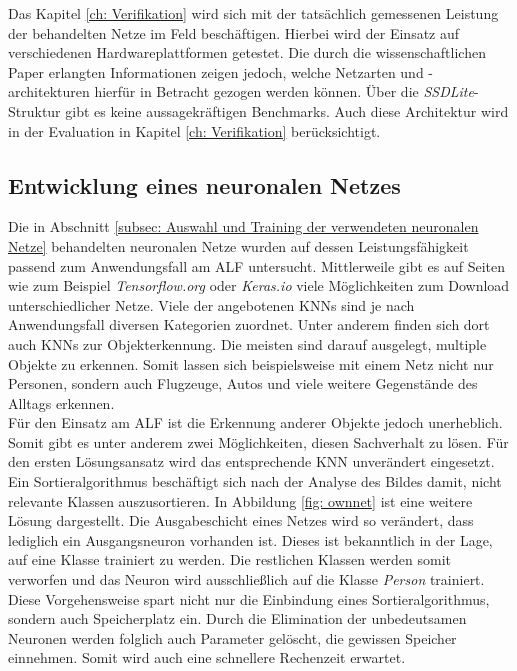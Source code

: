 		Das Kapitel \ref{ch: Verifikation} wird sich mit der tatsächlich gemessenen Leistung der behandelten Netze im Feld beschäftigen. Hierbei wird der Einsatz auf verschiedenen Hardwareplattformen getestet. Die durch die wissenschaftlichen Paper erlangten Informationen zeigen jedoch, welche Netzarten und -architekturen hierfür in Betracht gezogen werden können. Über die \textit{SSDLite}-Struktur gibt es keine aussagekräftigen Benchmarks. Auch diese Architektur wird in der Evaluation in Kapitel \ref{ch: Verifikation} berücksichtigt.
		
		\subsection{Entwicklung eines neuronalen Netzes}
		\label{subsec: Entwickeltes neuronales Netz}
		
		Die in Abschnitt \ref{subsec: Auswahl und Training der verwendeten neuronalen Netze} behandelten neuronalen Netze wurden auf dessen Leistungsfähigkeit passend zum Anwendungsfall am ALF untersucht. Mittlerweile gibt es auf Seiten wie zum Beispiel \textit{Tensorflow.org} oder \textit{Keras.io} viele Möglichkeiten zum Download unterschiedlicher Netze. Viele der angebotenen KNNs sind je nach Anwendungsfall diversen Kategorien zuordnet. Unter anderem finden sich dort auch KNNs zur Objekterkennung. Die meisten sind darauf ausgelegt, multiple Objekte zu erkennen. Somit lassen sich beispielsweise mit einem Netz nicht nur Personen, sondern auch Flugzeuge, Autos und viele weitere Gegenstände des Alltags erkennen. \\ 
		
		
		
		Für den Einsatz am ALF ist die Erkennung anderer Objekte jedoch unerheblich. Somit gibt es unter anderem zwei Möglichkeiten, diesen Sachverhalt zu lösen. Für den ersten Lösungsansatz wird das entsprechende KNN unverändert eingesetzt. Ein Sortieralgorithmus beschäftigt sich nach der Analyse des Bildes damit, nicht relevante Klassen auszusortieren. In Abbildung \ref{fig: ownnet} ist eine weitere Lösung dargestellt. Die Ausgabeschicht eines Netzes wird so verändert, dass lediglich ein Ausgangsneuron vorhanden ist. Dieses ist bekanntlich in der Lage, auf eine Klasse trainiert zu werden. Die restlichen Klassen werden somit verworfen und das Neuron wird ausschließlich auf die Klasse \textit{Person} trainiert. Diese Vorgehensweise spart nicht nur die Einbindung eines Sortieralgorithmus, sondern auch Speicherplatz ein. Durch die Elimination der unbedeutsamen Neuronen werden folglich auch Parameter gelöscht, die gewissen Speicher einnehmen. Somit wird auch eine schnellere Rechenzeit erwartet. \\
		
